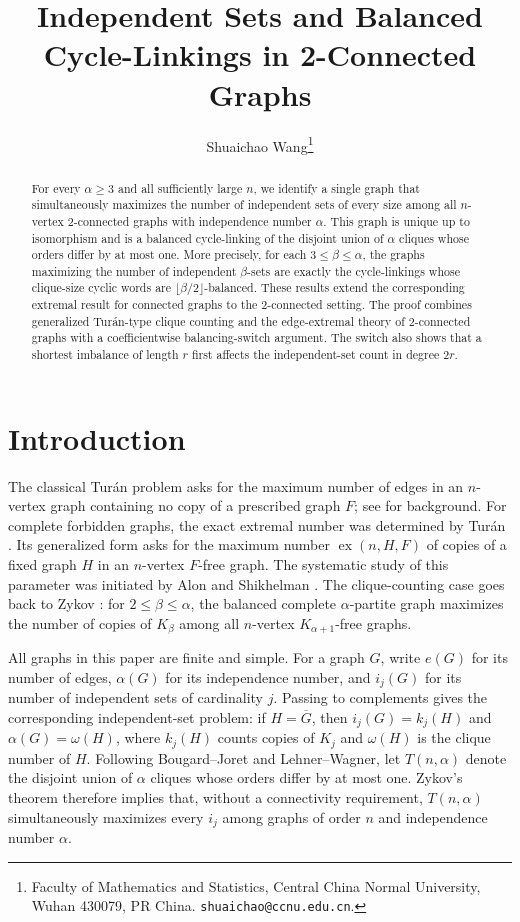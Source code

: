 \documentclass[11pt]{article}
\title{Independent Sets and Balanced Cycle-Linkings in 2-Connected Graphs}
\author{Shuaichao Wang\thanks{Faculty of Mathematics and Statistics,
Central China Normal University, Wuhan 430079, PR China.
\texttt{shuaichao@ccnu.edu.cn}.}}
\date{}
\theoremstyle{definition}
\begin{document}
\nocite{AlonShikhelman2016,Zykov1949,BougardJoret2008,DeLucaZamboni2021,FranklFurediKalai1988,Frohmader2008,LehnerWagner2017}


\maketitle

\begin{abstract}
For every $\alpha\ge3$ and all sufficiently large $n$, we identify a
single graph that simultaneously maximizes the number of independent
sets of every size among all $n$-vertex $2$-connected graphs with
independence number $\alpha$. This graph is unique up to isomorphism
and is a balanced cycle-linking of the disjoint union of $\alpha$
cliques whose orders differ by at most one. More precisely, for each
$3\le\beta\le\alpha$, the graphs maximizing the number of independent
$\beta$-sets are exactly the cycle-linkings whose clique-size cyclic
words are $\lfloor\beta/2\rfloor$-balanced. These results extend the
corresponding extremal result for connected graphs to the
$2$-connected setting. The proof combines generalized Tur\'an-type
clique counting and the edge-extremal theory of $2$-connected graphs
with a coefficientwise balancing-switch argument. The switch also
shows that a shortest imbalance of length $r$ first affects the
independent-set count in degree $2r$.
\end{abstract}


\section{Introduction}
The classical Tur\'an problem asks for the maximum number of edges
in an $n$-vertex graph containing no copy of a prescribed graph $F$;
see \cite{Bollobas1978} for background. For complete forbidden
graphs, the exact extremal number was determined by Tur\'an
\cite{Turan1941}. Its generalized form asks for the maximum number
$\operatorname{ex}(n,H,F)$ of copies of a fixed graph $H$ in an
$n$-vertex $F$-free graph. The systematic study of this parameter
was initiated by Alon and Shikhelman \cite{AlonShikhelman2016}.
The clique-counting case goes back to Zykov \cite{Zykov1949}:
for $2\le\beta\le\alpha$, the balanced complete $\alpha$-partite
graph maximizes the number of copies of $K_\beta$ among all
$n$-vertex $K_{\alpha+1}$-free graphs.


All graphs in this paper are finite and simple. For a graph $G$,
write $e(G)$ for its number of edges, $\alpha(G)$ for its independence
number, and $i_j(G)$ for its number of independent sets of
cardinality $j$. Passing to complements gives the corresponding
independent-set problem: if $H=\overline G$, then
$i_j(G)=k_j(H)$ and $\alpha(G)=\omega(H)$, where $k_j(H)$ counts
copies of $K_j$ and $\omega(H)$ is the clique number of $H$.
Following Bougard--Joret and Lehner--Wagner, let $T(n,\alpha)$
denote the disjoint union of $\alpha$ cliques whose orders differ
by at most one. Zykov's theorem therefore implies that, without a
connectivity requirement, $T(n,\alpha)$ simultaneously maximizes
every $i_j$ among graphs of order $n$ and independence number
$\alpha$.
\end{document}
